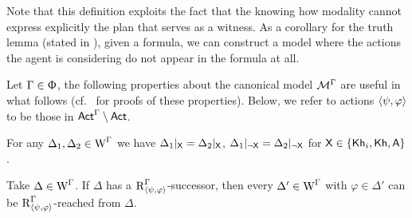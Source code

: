 Note that this definition exploits the fact that the knowing how modality cannot express explicitly the plan that serves as a witness.
As a corollary for the truth lemma (stated in ), given a formula, we can construct a model where the actions the agent is considering do not appear in the formula at all.

Let $\Gamma \in \Upphi$, the following properties about the canonical model $\mathcal{M}^\Gamma$ are useful in what follows (cf.~\cite{Wang2016,AFSVQ23report} for proofs of these properties). Below, we refer to actions $\langle \psi,\varphi \rangle$ to be those in ${\rm \sf Act}^\Gamma\setminus{\rm \sf Act}$.

\medskip

\begin{proposition}\label{pro:cm-ults-khiml-allsame}
For any $\Delta_1, \Delta_2 \in \operatorname{W}^\Gamma$ we have $\Delta_1|_{{\mathsf{X}}} = \Delta_2|_{{\mathsf{X}}}$, $\Delta_1|_{\lnot{\mathsf{X}}} = \Delta_2|_{\lnot{\mathsf{X}}}$ for ${\mathsf{X}} \in \{ {\sf Kh}_i,{\sf Kh},{\sf A} \}$.
\end{proposition}

\medskip

\begin{proposition}\label{pro:cm-ults-khiml-oneall}
Take $\Delta \in \operatorname{W}^\Gamma$. If $\Delta$ has a $\operatorname{R}^\Gamma_{\langle \psi,\varphi \rangle}$-successor, then every $\Delta' \in \operatorname{W}^\Gamma$ with $\varphi \in \Delta'$ can be $\operatorname{R}^\Gamma_{\langle \psi,\varphi \rangle}$-reached from $\Delta$.
\end{proposition}

